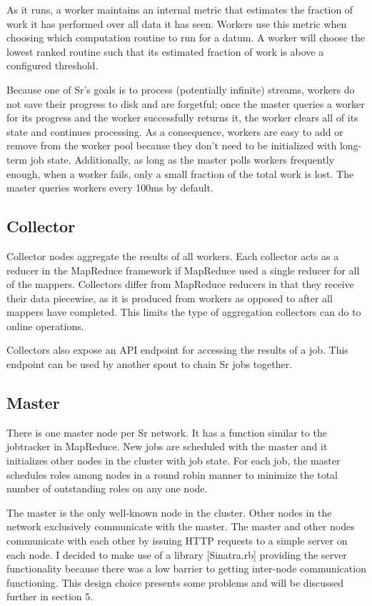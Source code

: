 \documentclass[12pt]{article}
\begin{document}
As it runs, a worker maintains an internal metric that estimates the fraction of work it has performed over all data it has seen. Workers use this metric when choosing which computation routine to run for a datum. A worker will choose the lowest ranked routine such that its estimated fraction of work is above a configured threshold.

Because one of Sr’s goals is to process (potentially infinite) streams, workers do not save their progress to disk and are forgetful; once the master queries a worker for its progress and the worker successfully returns it, the worker clears all of its state and continues processing. As a consequence, workers are easy to add or remove from the worker pool because they don’t need to be initialized with long-term job state. Additionally, as long as the master polls workers frequently enough, when a worker fails, only a small fraction of the total work is lost. The master queries workers every 100ms by default.
\subsection{Collector}
Collector nodes aggregate the results of all workers. Each collector acts as a reducer in the MapReduce framework if MapReduce used a single reducer for all of the mappers. Collectors differ from MapReduce reducers in that they receive their data piecewise, as it is produced from workers as opposed to after all mappers have completed. This limits the type of aggregation collectors can do to online operations.

Collectors also expose an API endpoint for accessing the results of a job. This endpoint can be used by another spout to chain Sr jobs together.
\subsection{Master}
There is one master node per Sr network. It has a function similar to the jobtracker in MapReduce. New jobs are scheduled with the master and it initializes other nodes in the cluster with job state. For each job, the master schedules roles among nodes in a round robin manner to minimize the total number of outstanding roles on any one node.

The master is the only well-known node in the cluster. Other nodes in the network exclusively communicate with the master. The master and other nodes communicate with each other by issuing HTTP requests to a simple server on each node. I decided to make use of a library [Sinatra.rb] providing the server functionality because there was a low barrier to getting inter-node communication functioning. This design choice presents some problems and will be discussed further in section 5.
\end{document}
